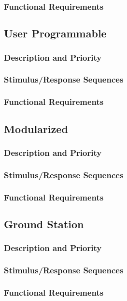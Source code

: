 \documentclass[english]{article}
\numberwithin{equation}{section} %
\begin{document}
\subsubsection{Functional Requirements}

\subsection{User Programmable}
\subsubsection{Description and Priority}
\subsubsection{Stimulus/Response Sequences}
\subsubsection{Functional Requirements}

\subsection{Modularized} 
\subsubsection{Description and Priority}
\subsubsection{Stimulus/Response Sequences}
\subsubsection{Functional Requirements}

\subsection{Ground Station}
\subsubsection{Description and Priority}
\subsubsection{Stimulus/Response Sequences}
\subsubsection{Functional Requirements}
\end{document}
